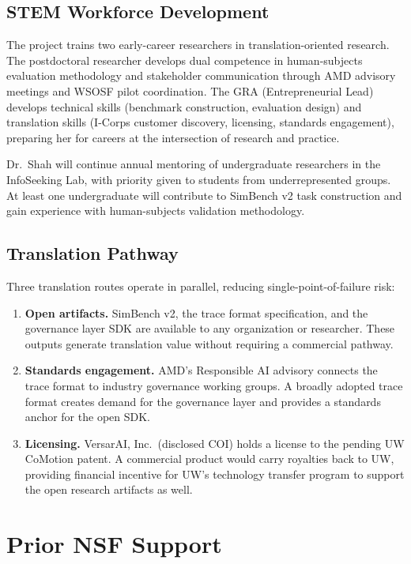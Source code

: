 \documentclass[11pt]{article}
\begin{document}
\subsection{STEM Workforce Development}

The project trains two early-career researchers in translation-oriented research. The postdoctoral researcher develops dual competence in human-subjects evaluation methodology and stakeholder communication through AMD advisory meetings and WSOSF pilot coordination. The GRA (Entrepreneurial Lead) develops technical skills (benchmark construction, evaluation design) and translation skills (I-Corps customer discovery, licensing, standards engagement), preparing her for careers at the intersection of research and practice.

Dr.\ Shah will continue annual mentoring of undergraduate researchers in the InfoSeeking Lab, with priority given to students from underrepresented groups. At least one undergraduate will contribute to SimBench v2 task construction and gain experience with human-subjects validation methodology.

\subsection{Translation Pathway}

Three translation routes operate in parallel, reducing single-point-of-failure risk:

\begin{enumerate}
  \item \textbf{Open artifacts.} SimBench v2, the trace format specification, and the governance layer SDK are available to any organization or researcher. These outputs generate translation value without requiring a commercial pathway.
  \item \textbf{Standards engagement.} AMD's Responsible AI advisory connects the trace format to industry governance working groups. A broadly adopted trace format creates demand for the governance layer and provides a standards anchor for the open SDK.
  \item \textbf{Licensing.} VersarAI, Inc.\ (disclosed COI) holds a license to the pending UW CoMotion patent. A commercial product would carry royalties back to UW, providing financial incentive for UW's technology transfer program to support the open research artifacts as well.
\end{enumerate}

\section{Prior NSF Support}
\end{document}
